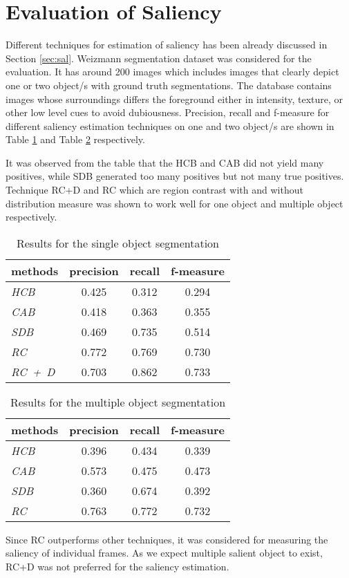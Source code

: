 \section{Evaluation of Saliency}
\label{sec:EvS}
Different techniques for estimation of saliency has been already discussed in Section \ref{sec:sal}.  Weizmann segmentation dataset was considered for the evaluation.  It has around 200 images which includes images that clearly depict one or two object/s with ground truth segmentations. The database contains images whose surroundings differs the foreground  either in intensity, texture, or other low level cues to avoid dubiousness.  Precision, recall and f-measure for different saliency estimation techniques on one and two object/s are shown in Table \ref{tab:salOneObj} and Table \ref{tab:salTwoObj} respectively. 
\par It was observed from the table that the HCB and CAB did not yield many positives, while SDB generated too many positives but not many true positives. Technique RC+D and RC which are region contrast with and without distribution measure was shown to work well for one object and multiple object respectively.
\begin{table}[htbp]
   \caption{Results for the single object segmentation}
   \begin{center}
   \begin{tabular}{|l|c|c|c|} \hline
     \textbf{methods} & \textbf{precision} & \textbf{recall} & \textbf{f-measure} \\ \hline
     \emph{HCB} & 0.425 & 0.312 & 0.294 \\
	 \emph{CAB} & 0.418 & 0.363 & 0.355 \\
 	 \emph{SDB} & 0.469 & 0.735 & 0.514 \\
	 \emph{RC}  & 0.772 & 0.769 & 0.730 \\
	 \emph{RC~+~D} & 0.703	& 0.862 & 0.733	\\ \hline
   \end{tabular}
   \label{tab:salOneObj}
   \medskip \small 
   \end{center}
 \end{table}
\begin{table}[htbp]
   \caption{Results for the multiple object segmentation}
   \begin{center}
   \begin{tabular}{|l|c|c|c|} \hline
     \textbf{methods} & \textbf{precision} & \textbf{recall} & \textbf{f-measure} \\ \hline
     \emph{HCB} & 0.396 & 0.434 & 0.339 \\
	 \emph{CAB} & 0.573 & 0.475 & 0.473 \\
 	 \emph{SDB} & 0.360 & 0.674 & 0.392 \\
	 \emph{RC}  & 0.763 & 0.772 & 0.732 \\ \hline
   \end{tabular}
   \label{tab:salTwoObj}
   \end{center}
 \end{table} 
\par Since RC outperforms other techniques, it was considered for measuring the saliency of individual frames.  As we expect multiple salient object to exist, RC+D was not preferred for the saliency estimation.
 
